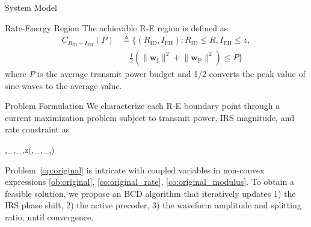 \documentclass[journal]{IEEEtran}
\begin{document}
\begin{section}{System Model}
		\begin{subsection}{Rate-Energy Region}
			The achievable R-E region is defined as
			\begin{align}
				C_{R_{\mathrm{ID}}-I_{\mathrm{EH}}}(P)
				&\triangleq \biggl\{(R_{\mathrm{ID}}, I_{\mathrm{EH}}): R_{\mathrm{ID}} \le R, I_{\mathrm{EH}} \le z,\nonumber\\
				&\quad \frac{1}{2}\left(\lVert{\boldsymbol{w}_{\mathrm{I}}}\rVert^2+\lVert{\boldsymbol{w}_{\mathrm{P}}}\rVert^2\right) \le P\biggr\}
			\end{align}
			where $P$ is the average transmit power budget and \num{1/2} converts the peak value of sine waves to the average value.
		\end{subsection}
	\end{section}


	\begin{section}{Problem Formulation}\label{se:problem_formulation}
		We characterize each R-E boundary point through a current maximization problem subject to transmit power, IRS magnitude, and rate constraint as
		\begin{maxi!}
			{\boldsymbol{\phi},_{},_{},\rho}{z(\boldsymbol{\phi},_{},_{},\rho)}{\label{op:original}}{\label{ob:original}}
			\label{co:original_power}
			\label{co:original_rate}
			\label{co:original_modulus}
		\end{maxi!}

		Problem~\eqref{op:original} is intricate with coupled variables in non-convex expressions \eqref{ob:original}, \eqref{co:original_rate}, \eqref{co:original_modulus}. To obtain a feasible solution, we propose an BCD algorithm that iteratively updates 1) the IRS phase shift, 2) the active precoder, 3) the waveform amplitude and splitting ratio, until convergence.



\end{section}
\end{document}
